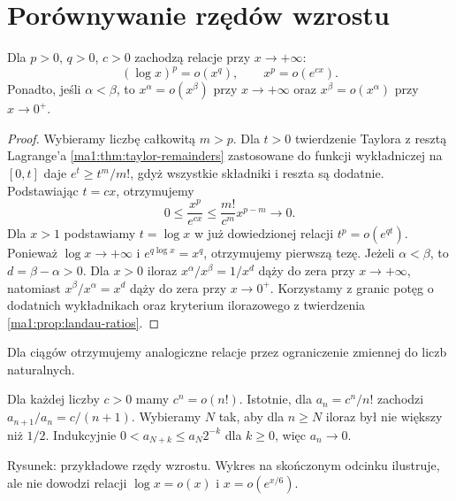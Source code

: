 \section{Porównywanie rzędów wzrostu}
\begin{twierdzenie}
\label{ma1:thm:asymptotic-growth}
Dla $p>0$, $q>0$, $c>0$ zachodzą relacje przy $x\to+\infty$:
\[
 (\log x)^p=o(x^q),\qquad x^p=o(e^{cx}).
\]
Ponadto, jeśli $\alpha<\beta$, to $x^\alpha=o(x^\beta)$ przy $x\to+\infty$ oraz $x^\beta=o(x^\alpha)$ przy $x\to0^+$.
\end{twierdzenie}
\begin{proof}
Wybieramy liczbę całkowitą $m>p$. Dla $t>0$ twierdzenie Taylora z resztą Lagrange'a \ref{ma1:thm:taylor-remainders} zastosowane do funkcji wykładniczej na $[0,t]$ daje $e^t\ge t^m/m!$, gdyż wszystkie składniki i reszta są dodatnie. Podstawiając $t=cx$, otrzymujemy
\[
 0\le \frac{x^p}{e^{cx}}\le\frac{m!}{c^m}x^{p-m}\longrightarrow0.
\]
Dla $x>1$ podstawiamy $t=\log x$ w już dowiedzionej relacji $t^p=o(e^{qt})$. Ponieważ $\log x\to+\infty$ i $e^{q\log x}=x^q$, otrzymujemy pierwszą tezę. Jeżeli $\alpha<\beta$, to $d=\beta-\alpha>0$. Dla $x>0$ iloraz $x^\alpha/x^\beta=1/x^d$ dąży do zera przy $x\to+\infty$, natomiast $x^\beta/x^\alpha=x^d$ dąży do zera przy $x\to0^+$. Korzystamy z granic potęg o dodatnich wykładnikach oraz kryterium ilorazowego z twierdzenia \ref{ma1:prop:landau-ratios}.
\end{proof}
Dla ciągów otrzymujemy analogiczne relacje przez ograniczenie zmiennej do liczb naturalnych.
\begin{przyklad}
\label{ma1:ex:factorial-growth}
Dla każdej liczby $c>0$ mamy $c^n=o(n!)$. Istotnie, dla $a_n=c^n/n!$ zachodzi $a_{n+1}/a_n=c/(n+1)$. Wybieramy $N$ tak, aby dla $n\ge N$ iloraz był nie większy niż $1/2$. Indukcyjnie $0<a_{N+k}\le a_N2^{-k}$ dla $k\ge0$, więc $a_n\to0$.
\end{przyklad}

\begin{center}

\small Rysunek: przykładowe rzędy wzrostu. Wykres na skończonym odcinku ilustruje, ale nie dowodzi relacji $\log x=o(x)$ i $x=o(e^{x/6})$.
\end{center}

